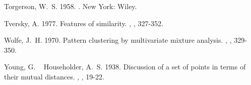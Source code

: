 \documentclass[11pt]{article}
\begin{document}
\begin{thebibliography}{}
%
%
Torgerson, W.~S.%
%
\newblock{}\BBOP{}1958\BBCP{}.
\newblock{}.
\newblock{}New York: Wiley.

%
%
Tversky, A.%
%
\newblock{}\BBOP{}1977\BBCP{}.
\newblock{}\BBOQ{}Features of similarity.\BBCQ{}
\newblock{}, , 327-352.

%
%
Wolfe, J.~H.%
%
\newblock{}\BBOP{}1970\BBCP{}.
\newblock{}\BBOQ{}Pattern clustering by multivariate mixture analysis.\BBCQ{}
\newblock{}, , 329-350.

%
%
Young, G.%
\BCBT{}\ \BBA{} Householder, A.~S.%
%
\newblock{}\BBOP{}1938\BBCP{}.
\newblock{}\BBOQ{}Discussion of a set of points in terms of their mutual
  distances.\BBCQ{}
\newblock{}, , 19-22.

\end{thebibliography}
\end{document}

